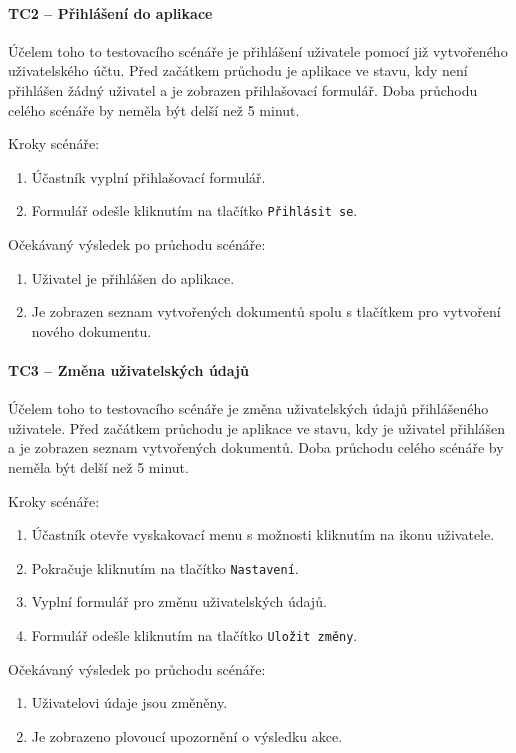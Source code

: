 \paragraph{TC2 -- Přihlášení do aplikace}

Účelem toho to testovacího scénáře je přihlášení uživatele pomocí již vytvořeného uživatelského účtu.
Před začátkem průchodu je aplikace ve stavu, kdy není přihlášen žádný uživatel a je zobrazen přihlašovací formulář.
Doba průchodu celého scénáře by neměla být delší než 5 minut.

Kroky scénáře:
\begin{enumerate}
    \item Účastník vyplní přihlašovací formulář.
    \item Formulář odešle kliknutím na tlačítko \texttt{Přihlásit se}.
\end{enumerate}

Očekávaný výsledek po průchodu scénáře:
\begin{enumerate}
    \item Uživatel je přihlášen do aplikace.
    \item Je zobrazen seznam vytvořených dokumentů spolu s tlačítkem pro vytvoření nového dokumentu.
\end{enumerate}

\paragraph{TC3 -- Změna uživatelských údajů}

Účelem toho to testovacího scénáře je změna uživatelských údajů přihlášeného uživatele.
Před začátkem průchodu je aplikace ve stavu, kdy je uživatel přihlášen a je zobrazen seznam vytvořených dokumentů.
Doba průchodu celého scénáře by neměla být delší než 5 minut.

Kroky scénáře:
\begin{enumerate}
    \item Účastník otevře vyskakovací menu s možnosti kliknutím na ikonu uživatele.
    \item Pokračuje kliknutím na tlačítko \texttt{Nastavení}.
    \item Vyplní formulář pro změnu uživatelských údajů.
    \item Formulář odešle kliknutím na tlačítko \texttt{Uložit změny}.
\end{enumerate}

Očekávaný výsledek po průchodu scénáře:
\begin{enumerate}
    \item Uživatelovi údaje jsou změněny.
    \item Je zobrazeno plovoucí upozornění o výsledku akce.
\end{enumerate}

